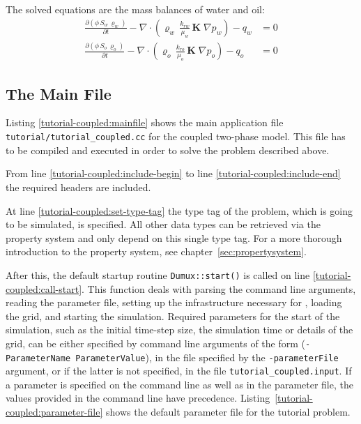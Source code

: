The solved equations are the mass balances of water and oil:
\begin{align}
  \label{massbalancewater}
  \frac {\partial (\phi \, S_{w}\, \varrho_{w})}{\partial t}
  -
  \nabla \cdot \left( \varrho_{w} \, \frac{k_{rw}}{\mu_{w}} \, \mathbf{K}\;\nabla p_w \right)
  -
  q_w
  & =
  0 \\
  \label{massbalanceoil}
  \frac {\partial (\phi \, S_{o}\, \varrho_{o})}{\partial t}
  -
  \nabla \cdot \left( \varrho_{o} \, \frac{k_{ro}}{\mu_{o}} \, \mathbf{K}\;\nabla p_o \right)
  -
  q_o 
  & =
  0
\end{align}

\subsection{The Main File}

Listing \ref{tutorial-coupled:mainfile} shows the main application file
\texttt{tutorial/tutorial\_coupled.cc} for the coupled two-phase
model. This file has to be compiled and executed in order to solve the problem described
above.

\begin{lst}\label{tutorial-coupled:mainfile} \mbox{}
  
\end{lst}

From line \ref{tutorial-coupled:include-begin} to line
\ref{tutorial-coupled:include-end} the required headers are included.

At line \ref{tutorial-coupled:set-type-tag} the type tag of the
problem, which is going to be simulated, is specified. All other data
types can be retrieved via the \Dumux property system and only depend
on this single type tag. For a more thorough introduction to the
\Dumux property system, see chapter~\ref{sec:propertysystem}.

After this, the default startup routine \texttt{Dumux::start()} is
called on line \ref{tutorial-coupled:call-start}. This function deals
with parsing the command line arguments, reading the parameter file,
setting up the infrastructure necessary for \Dune, loading the grid, and
starting the simulation. 
Required parameters for the start of the simulation, 
such as the initial time-step size, the simulation time or details of the grid,
can be either specified by command line arguments of the form
(\texttt{-ParameterName ParameterValue}), in the file specified by the
\texttt{-parameterFile} argument, or if the latter is not specified,
in the file \mbox{\texttt{tutorial\_coupled.input}}. 
If a parameter is
specified on the command line as well as in the parameter file, the
values provided in the command line have
precedence. Listing~\ref{tutorial-coupled:parameter-file} shows the
default parameter file for the tutorial problem.

